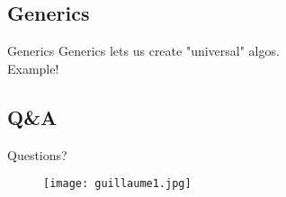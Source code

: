 \subsection*{Generics}
\begin{frame}{Generics}
    Generics lets us create "universal" algos.\\
    Example!

\end{frame}
\subsection*{Q\&A}
\begin{frame}{Questions?}
    \begin{figure}
        \centering
        \texttt{[image: guillaume1.jpg]}
    \end{figure}
\end{frame}